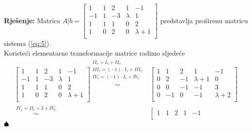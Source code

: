 \documentclass{article}
\newenvironment{solution}{\noindent\textbf{Rje\v senje:\newline}}{$\hfill\spadesuit$}
\begin{document}
\begin{solution}
    Matrica $A|b=\left[
        \begin{array}{cccc|c}
            1 & 1 & 2 & 1 & -1 \\
            -1 & 1 & -3 & \lambda & 1 \\
            1 & 1 & 1 & 0 & 2 \\
            1 & 0 & 2 & 0 & \lambda +1 \\
        \end{array}
    \right]$ predstavlja pro\v sirenu matricu sistema (\ref{eq:5}).\\
    Koriste\' ci elementarne transformacije matrice radimo sljede\' ce
    \begin{equation*}
        \begin{aligned}
            \left[
                \begin{array}{cccc|c}
                    1 & 1 & 2 & 1 & -1 \\
                    -1 & 1 & -3 & \lambda & 1 \\
                    1 & 1 & 1 & 0 & 2 \\
                    1 & 0 & 2 & 0 & \lambda +1 \\
                \end{array}
            \right]\overset{\begin{array}{c}
                II_v=I_v+II_v \\
                III_v=(-1)\cdot I_v+III_v \\
                IV_v=(-1)\cdot I_v+IV_v \\
            \end{array}}{\sim}&\left[
                \begin{array}{cccc|c}
                    1 & 1 & 2 & 1 & -1 \\
                    0 & 2 & -1 & \lambda + 1 & 0 \\
                    0 & 0 & -1 & -1 & 3 \\
                    0 & -1 & 0 & -1 & \lambda + 2 \\
                \end{array}
            \right]\\
            \overset{\begin{array}{c}
                IV_v=II_v+2+IV_v
            \end{array}}{\sim}&\left[
                \begin{array}{cccc|c}
                    1 & 1 & 2 & 1 & -1 \\

\end{array}
\end{aligned}
\end{equation*}
\end{solution}
\end{document}
